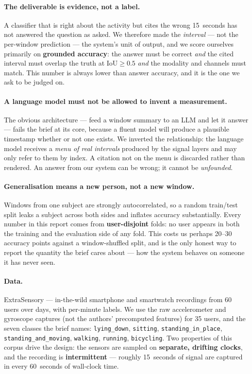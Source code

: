 \documentclass[11pt,a4paper]{article}
\newcommand{\code}[1]{\texttt{\small #1}}
\begin{document}
\paragraph{The deliverable is evidence, not a label.} A classifier that is right about
the activity but cites the wrong 15~seconds has not answered the question as asked. We
therefore made the \emph{interval} --- not the per-window prediction --- the system's
unit of output, and we score ourselves primarily on \textbf{grounded accuracy}: the
answer must be correct \emph{and} the cited interval must overlap the truth at
$\mathrm{IoU} \ge 0.5$ \emph{and} the modality and channels must match. This number is
always lower than answer accuracy, and it is the one we ask to be judged on.

\paragraph{A language model must not be allowed to invent a measurement.} The obvious
architecture --- feed a window summary to an LLM and let it answer --- fails the brief
at its core, because a fluent model will produce a plausible timestamp whether or not
one exists. We inverted the relationship: the language model receives a \emph{menu of
real intervals} produced by the signal layers and may only refer to them by index. A
citation not on the menu is discarded rather than rendered. An answer from our system
can be wrong; it cannot be \emph{unfounded}.

\paragraph{Generalisation means a new person, not a new window.} Windows from one
subject are strongly autocorrelated, so a random train/test split leaks a subject
across both sides and inflates accuracy substantially. Every number in this report comes
from \textbf{user-disjoint} folds: no user appears in both the training and the
evaluation side of any fold. This costs us perhaps 20--30 accuracy points against a
window-shuffled split, and is the only honest way to report the quantity the brief
cares about --- how the system behaves on someone it has never seen.

\paragraph{Data.} ExtraSensory \cite{vaizman2017} --- in-the-wild smartphone and
smartwatch recordings from 60 users over days, with per-minute labels. We use the raw
accelerometer and gyroscope captures (not the authors' precomputed features) for 35
users, and the seven classes the brief names: \code{lying\_down}, \code{sitting},
\code{standing\_in\_place}, \code{standing\_and\_moving}, \code{walking},
\code{running}, \code{bicycling}. Two properties of this corpus drive the design: the
sensors are sampled on \textbf{separate, drifting clocks}, and the recording is
\textbf{intermittent} --- roughly 15~seconds of signal are captured in every 60~seconds
of wall-clock time.
\end{document}
